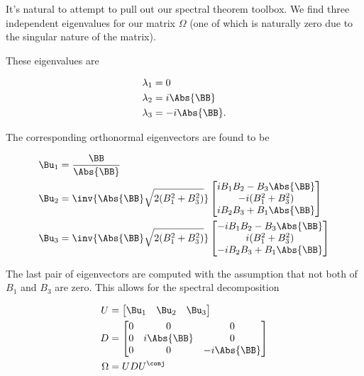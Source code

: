 It's natural to attempt to pull out our spectral theorem toolbox.  We find three independent eigenvalues for our matrix $\Omega$ (one of which is naturally zero due to the singular nature of the matrix).

These eigenvalues are

\begin{align}\label{eqn:lorentzRotation:420}
\lambda_1 &= 0 \\
\lambda_2 &= i\Abs{\BB} \\
\lambda_3 &= -i\Abs{\BB}.
\end{align}

The corresponding orthonormal eigenvectors are found to be

\begin{align}\label{eqn:lorentzRotation:440}
\Bu_1 &= \frac{\BB}{\Abs{\BB}} \\
\Bu_2 &=
\inv{\Abs{\BB} \sqrt{ 2(B_1^2 + B_3^2) } }
\begin{bmatrix}
i B_1 B_2 - B_3 \Abs{\BB} \\
-i(B_1^2 + B_3^2) \\
i B_2 B_3 + B_1 \Abs{\BB} \\
\end{bmatrix} \\
\Bu_3 &=
\inv{\Abs{\BB} \sqrt{ 2(B_1^2 + B_3^2) } }
\begin{bmatrix}
-i B_1 B_2 - B_3 \Abs{\BB} \\
i(B_1^2 + B_3^2) \\
-i B_2 B_3 + B_1 \Abs{\BB} \\
\end{bmatrix}
\end{align}

The last pair of eigenvectors are computed with the assumption that not both of $B_1$ and $B_3$ are zero.  This allows for the spectral decomposition

\begin{align}\label{eqn:lorentzRotation:460}
U &=
\begin{bmatrix}
\Bu_1 & \Bu_2 & \Bu_3
\end{bmatrix} \\
D &= \begin{bmatrix}
0 & 0 & 0 \\
0 & i \Abs{\BB} & 0 \\
0 & 0 & -i \Abs{\BB}
\end{bmatrix} \\
\Omega &= U D U^\conj
\end{align}

